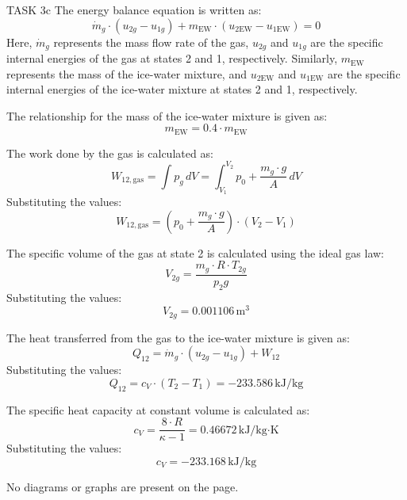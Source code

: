 TASK 3c  
The energy balance equation is written as:  
\[
\dot{m}_g \cdot (u_{2g} - u_{1g}) + m_{\text{EW}} \cdot (u_{2\text{EW}} - u_{1\text{EW}}) = 0
\]  
Here, \( \dot{m}_g \) represents the mass flow rate of the gas, \( u_{2g} \) and \( u_{1g} \) are the specific internal energies of the gas at states 2 and 1, respectively. Similarly, \( m_{\text{EW}} \) represents the mass of the ice-water mixture, and \( u_{2\text{EW}} \) and \( u_{1\text{EW}} \) are the specific internal energies of the ice-water mixture at states 2 and 1, respectively.

The relationship for the mass of the ice-water mixture is given as:  
\[
m_{\text{EW}} = 0.4 \cdot m_{\text{EW}}
\]  

The work done by the gas is calculated as:  
\[
W_{12,\text{gas}} = \int p_g \, dV = \int_{V_1}^{V_2} p_0 + \frac{m_g \cdot g}{A} \, dV
\]  
Substituting the values:  
\[
W_{12,\text{gas}} = (p_0 + \frac{m_g \cdot g}{A}) \cdot (V_2 - V_1)
\]  

The specific volume of the gas at state 2 is calculated using the ideal gas law:  
\[
V_{2g} = \frac{m_g \cdot R \cdot T_{2g}}{p_2g}
\]  
Substituting the values:  
\[
V_{2g} = 0.001106 \, \text{m}^3
\]  

The heat transferred from the gas to the ice-water mixture is given as:  
\[
Q_{12} = \dot{m}_g \cdot (u_{2g} - u_{1g}) + W_{12}
\]  
Substituting the values:  
\[
Q_{12} = c_V \cdot (T_2 - T_1) = -233.586 \, \text{kJ/kg}
\]  

The specific heat capacity at constant volume is calculated as:  
\[
c_V = \frac{8 \cdot R}{\kappa - 1} = 0.46672 \, \text{kJ/kg·K}
\]  
Substituting the values:  
\[
c_V = -233.168 \, \text{kJ/kg}
\]  

No diagrams or graphs are present on the page.